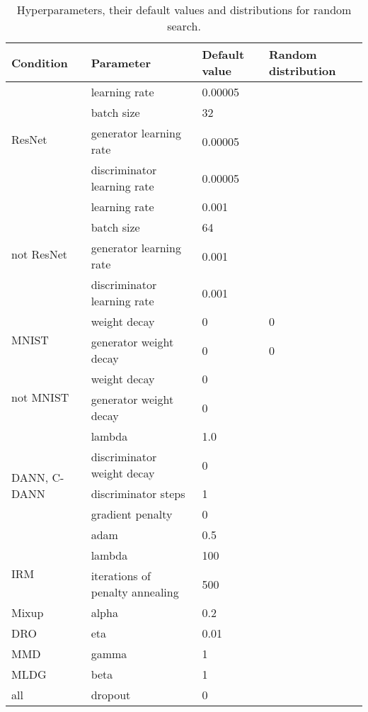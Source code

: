 \documentclass{article}
\begin{document}
\begin{table}[H]
    \caption{Hyperparameters, their default values and distributions for random search.} 
    \begin{center}
    { 
    \begin{tabular}{llll}
        \toprule
        \textbf{Condition} & \textbf{Parameter} & \textbf{Default value} & \textbf{Random distribution}\\
        \midrule
        \multirow{4}{*}{ResNet}       & learning rate & 0.00005 & \\
                                      & batch size    & 32   & \\
                                      & generator learning rate & 0.00005 & \\
                                      & discriminator learning rate & 0.00005 & \\
        \midrule
        \multirow{4}{*}{not ResNet}   & learning rate & 0.001 & \\
                                      & batch size    & 64   & \\
                                      & generator learning rate & 0.001 & \\
                                      & discriminator learning rate & 0.001 & \\
        \midrule
        \multirow{2}{*}{MNIST}        & weight decay & 0    & 0\\
                                      & generator weight decay & 0    & 0\\
        \midrule
        \multirow{2}{*}{not MNIST}    & weight decay & 0    & \\
                                      & generator weight decay & 0    & \\
        \midrule
        \multirow{5}{1.5cm}{DANN, C-DANN} & lambda                 & 1.0    & \\
         & discriminator weight decay & 0    & \\
         & discriminator steps        & 1    & \\
         & gradient penalty           & 0    & \\
         & adam              & 0.5    & \\
        \midrule
        \multirow{2}{*}{IRM}          & lambda  & 100    & \\
                                      & iterations of penalty annealing & 500 & \\
        \midrule
        Mixup                         & alpha & 0.2 & \\
        \midrule
        DRO                           & eta   & 0.01 & \\
        \midrule
        MMD                           & gamma & 1 & \\
        \midrule
        MLDG           & beta & 1 & \\
        \midrule
        all          & dropout & 0    & \\
        \bottomrule
    \end{tabular}
    }
    \end{center}
    \label{table:hyperparameters}
\end{table}
\end{document}

